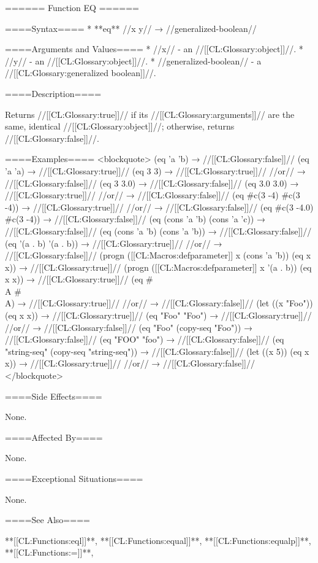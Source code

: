 ====== Function EQ ======

====Syntax====
  * **eq** //x y// → //generalized-boolean//

====Arguments and Values====
  * //x// - an //[[CL:Glossary:object]]//.
  * //y// - an //[[CL:Glossary:object]]//.
  * //generalized-boolean// - a //[[CL:Glossary:generalized boolean]]//.

====Description====

Returns //[[CL:Glossary:true]]// if its //[[CL:Glossary:arguments]]// are the same, identical //[[CL:Glossary:object]]//; otherwise, returns //[[CL:Glossary:false]]//.

====Examples==== <blockquote> (eq 'a 'b) → //[[CL:Glossary:false]]// (eq 'a 'a) → //[[CL:Glossary:true]]// (eq 3 3) → //[[CL:Glossary:true]]// //or// → //[[CL:Glossary:false]]// (eq 3 3.0) → //[[CL:Glossary:false]]// (eq 3.0 3.0) → //[[CL:Glossary:true]]// //or// → //[[CL:Glossary:false]]// (eq #c(3 -4) #c(3 -4)) → //[[CL:Glossary:true]]// //or// → //[[CL:Glossary:false]]// (eq #c(3 -4.0) #c(3 -4)) → //[[CL:Glossary:false]]// (eq (cons 'a 'b) (cons 'a 'c)) → //[[CL:Glossary:false]]// (eq (cons 'a 'b) (cons 'a 'b)) → //[[CL:Glossary:false]]// (eq '(a . b) '(a . b)) → //[[CL:Glossary:true]]// //or// → //[[CL:Glossary:false]]// (progn ([[CL:Macros:defparameter]] x (cons 'a 'b)) (eq x x)) → //[[CL:Glossary:true]]// (progn ([[CL:Macros:defparameter]] x '(a . b)) (eq x x)) → //[[CL:Glossary:true]]// (eq #\\A #\\A) → //[[CL:Glossary:true]]// //or// → //[[CL:Glossary:false]]// (let ((x "Foo")) (eq x x)) → //[[CL:Glossary:true]]// (eq "Foo" "Foo") → //[[CL:Glossary:true]]// //or// → //[[CL:Glossary:false]]// (eq "Foo" (copy-seq "Foo")) → //[[CL:Glossary:false]]// (eq "FOO" "foo") → //[[CL:Glossary:false]]// (eq "string-seq" (copy-seq "string-seq")) → //[[CL:Glossary:false]]// (let ((x 5)) (eq x x)) → //[[CL:Glossary:true]]// //or// → //[[CL:Glossary:false]]// </blockquote>

====Side Effects====

None.

====Affected By====

None.

====Exceptional Situations====

None.

====See Also====

**[[CL:Functions:eql]]**, **[[CL:Functions:equal]]**, **[[CL:Functions:equalp]]**, **[[CL:Functions:=]]**, {\secref\Compilation}

